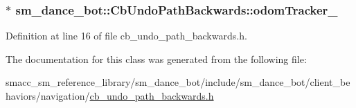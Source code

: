 \subsubsection[{\texorpdfstring{odom\+Tracker\+\_\+}{odomTracker_}}]{$\ast$ sm\+\_\+dance\+\_\+bot\+::\+Cb\+Undo\+Path\+Backwards\+::odom\+Tracker\+\_\+\hspace{0.3cm}{\ttfamily [private]}}\hypertarget{classsm__dance__bot_1_1CbUndoPathBackwards_a51cc8ec7a7e9da1f3cb4c1816b382af9}{}\label{classsm__dance__bot_1_1CbUndoPathBackwards_a51cc8ec7a7e9da1f3cb4c1816b382af9}


Definition at line 16 of file cb\+\_\+undo\+\_\+path\+\_\+backwards.\+h.



The documentation for this class was generated from the following file\+:\begin{DoxyCompactItemize}
\item 
smacc\+\_\+sm\+\_\+reference\+\_\+library/sm\+\_\+dance\+\_\+bot/include/sm\+\_\+dance\+\_\+bot/client\+\_\+behaviors/navigation/\hyperlink{cb__undo__path__backwards_8h}{cb\+\_\+undo\+\_\+path\+\_\+backwards.\+h}\end{DoxyCompactItemize}
